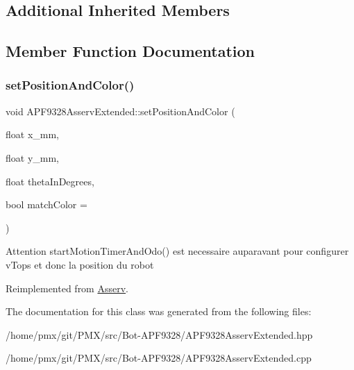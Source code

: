 \subsection*{Additional Inherited Members}


\subsection{Member Function Documentation}
\mbox{\label{classAPF9328AsservExtended_ad4c9b6504309467b4f1c820fb3202b12}} 
\subsubsection{\texorpdfstring{set\+Position\+And\+Color()}{setPositionAndColor()}}
{\footnotesize\ttfamily void A\+P\+F9328\+Asserv\+Extended\+::set\+Position\+And\+Color (\begin{DoxyParamCaption}\item[{float}]{x\+\_\+mm,  }\item[{float}]{y\+\_\+mm,  }\item[{float}]{theta\+In\+Degrees,  }\item[{bool}]{match\+Color = {} }\end{DoxyParamCaption})\hspace{0.3cm}{\ttfamily [virtual]}}

Attention start\+Motion\+Timer\+And\+Odo() est necessaire auparavant pour configurer v\+Tops et donc la position du robot 

Reimplemented from \hyperlink{classAsserv}{Asserv}.



The documentation for this class was generated from the following files\+:\begin{DoxyCompactItemize}
\item 
/home/pmx/git/\+P\+M\+X/src/\+Bot-\/\+A\+P\+F9328/A\+P\+F9328\+Asserv\+Extended.\+hpp\item 
/home/pmx/git/\+P\+M\+X/src/\+Bot-\/\+A\+P\+F9328/A\+P\+F9328\+Asserv\+Extended.\+cpp\end{DoxyCompactItemize}
